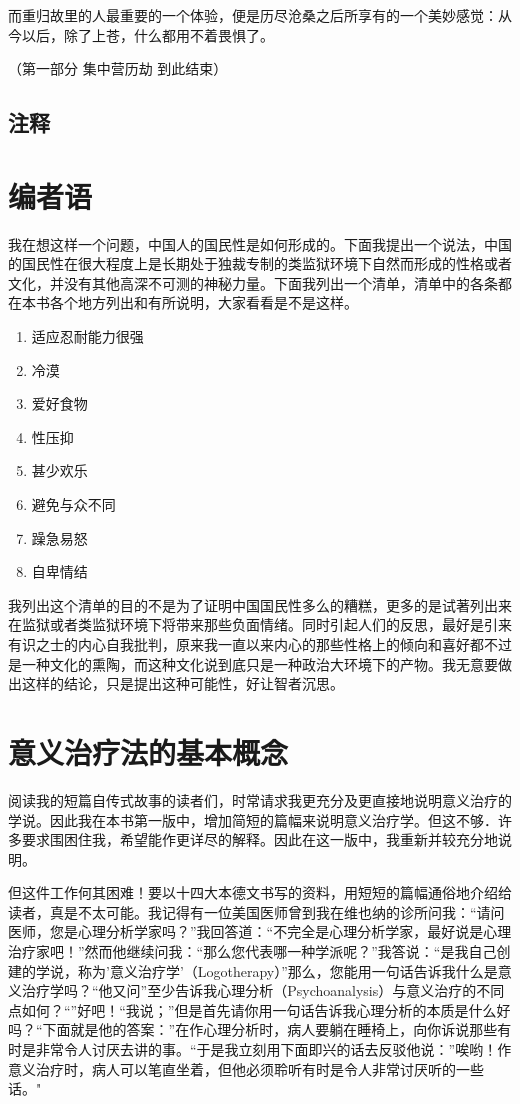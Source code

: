 \documentclass[11pt,oneside]{book}
\begin{document}
\begin{common-format}
而重归故里的人最重要的一个体验，便是历尽沧桑之后所享有的一个美妙感觉：从今以后，除了上苍，什么都用不着畏惧了。

（第一部分 集中营历劫 到此结束）



\section{注释}
\showendnotes

\chapter{编者语}
我在想这样一个问题，中国人的国民性是如何形成的。下面我提出一个说法，中国的国民性在很大程度上是长期处于独裁专制的类监狱环境下自然而形成的性格或者文化，并没有其他高深不可测的神秘力量。下面我列出一个清单，清单中的各条都在本书各个地方列出和有所说明，大家看看是不是这样。
\begin{enumerate}
\item 适应忍耐能力很强 \pageref{适应}
\item 冷漠 \pageref{冷漠}
\item 爱好食物 \pageref{爱好食物}
\item 性压抑 \pageref{性压抑}
\item 甚少欢乐 \pageref{甚少快乐}
\item 避免与众不同 \pageref{不要与众不同}
\item 躁急易怒 \pageref{躁急易怒}
\item 自卑情结 \pageref{自卑情结}
\end{enumerate}

我列出这个清单的目的不是为了证明中国国民性多么的糟糕，更多的是试著列出来在监狱或者类监狱环境下将带来那些负面情绪。同时引起人们的反思，最好是引来有识之士的内心自我批判，原来我一直以来内心的那些性格上的倾向和喜好都不过是一种文化的熏陶，而这种文化说到底只是一种政治大环境下的产物。我无意要做出这样的结论，只是提出这种可能性，好让智者沉思。




\chapter{意义治疗法的基本概念}
阅读我的短篇自传式故事的读者们，时常请求我更充分及更直接地说明意义治疗的学说。因此我在本书第一版中，增加简短的篇幅来说明意义治疗学。但这不够．许多要求围困住我，希望能作更详尽的解释。因此在这一版中，我重新并较充分地说明。

但这件工作何其困难！要以十四大本德文书写的资料，用短短的篇幅通俗地介绍给读者，真是不太可能。我记得有一位美国医师曾到我在维也纳的诊所问我：“请问医师，您是心理分析学家吗？”我回答道：“不完全是心理分析学家，最好说是心理治疗家吧！”然而他继续问我：“那么您代表哪一种学派呢？”我答说：“是我自己创建的学说，称为'意义治疗学'（Logotherapy）”那么，您能用一句话告诉我什么是意义治疗学吗？“他又问”至少告诉我心理分析（Psychoanalysis）与意义治疗的不同点如何？“”好吧！“我说；”但是首先请你用一句话告诉我心理分析的本质是什么好吗？“下面就是他的答案：”在作心理分析时，病人要躺在睡椅上，向你诉说那些有时是非常令人讨厌去讲的事。“于是我立刻用下面即兴的话去反驳他说：”唉哟！作意义治疗时，病人可以笔直坐着，但他必须聆听有时是令人非常讨厌听的一些话。"


\end{common-format}
\end{document}
